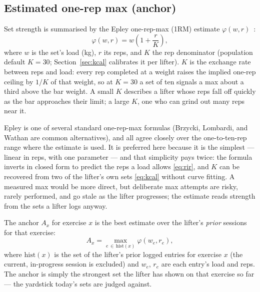 \documentclass[11pt,a4paper]{article}
\begin{document}
\subsection{Estimated one-rep max (anchor)}
Set strength is summarised by the Epley one-rep-max (1RM) estimate $\varphi(w,r)$~\cite{epley}:
\begin{equation}\label{eq:epley}
\varphi(w,r)=w\left(1+\frac{r}{K}\right),
\end{equation}
where $w$ is the set's load (kg), $r$ its reps, and $K$ the rep denominator (population default $K=30$; Section~\ref{sec:kcal} calibrates it per lifter). $K$ is the exchange rate between reps and load: every rep completed at a weight raises the implied one-rep ceiling by $1/K$ of that weight, so at $K=30$ a set of ten signals a max about a third above the bar weight. A small $K$ describes a lifter whose reps fall off quickly as the bar approaches their limit; a large $K$, one who can grind out many reps near it.

Epley is one of several standard one-rep-max formulas (Brzycki, Lombardi, and Wathan are common alternatives), and all agree closely over the one-to-ten-rep range where the estimate is used. It is preferred here because it is the simplest --- linear in reps, with one parameter --- and that simplicity pays twice: the formula inverts in closed form to predict the reps a load allows \eqref{eq:rir}, and $K$ can be recovered from two of the lifter's own sets \eqref{eq:kcal} without curve fitting. A measured max would be more direct, but deliberate max attempts are risky, rarely performed, and go stale as the lifter progresses; the estimate reads strength from the sets a lifter logs anyway.

The anchor $A_x$ for exercise $x$ is the best estimate over the lifter's \emph{prior} sessions for that exercise:
\begin{equation}\label{eq:anchor}
A_x=\max_{e\,\in\,\mathrm{hist}(x)}\varphi(w_e,r_e),
\end{equation}
where $\mathrm{hist}(x)$ is the set of the lifter's prior logged entries for exercise $x$ (the current, in-progress session is excluded) and $w_e$, $r_e$ are each entry's load and reps. The anchor is simply the strongest set the lifter has shown on that exercise so far --- the yardstick today's sets are judged against.
\end{document}
